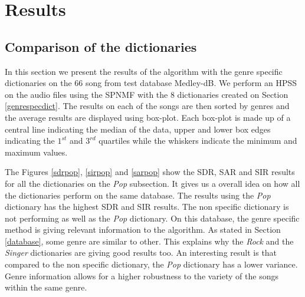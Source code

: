 \documentclass{article}
\begin{document}
\section{Results}


\subsection{Comparison of the dictionaries}

In this section we present the results of the algorithm with the genre specific dictionaries on the $66$ song from test database Medley-dB. We perform an HPSS on the audio files using the SPNMF with the $8$ dictionaries created on Section \ref{genrespecdict}. The results on each of the songs are then sorted by genres and the average results are displayed using box-plot. Each box-plot is made up of a central line indicating the median of the data, upper and lower box edges indicating the $1^{st}$ and $3^{rd}$ quartiles while the whiskers indicate the minimum and maximum values. 

The Figures \ref{sdrpop}, \ref{sirpop} and \ref{sarpop} show the SDR, SAR and SIR results for all the dictionaries on the \emph{Pop} subsection. It gives us a overall idea on how all the dictionaries perform on the same database. The results using the \emph{Pop} dictionary has the highest SDR and SIR results. The non specific dictionary is not performing as well as the \emph{Pop} dictionary. On this database, the genre specific method is giving relevant information to the algorithm. As stated in Section \ref{database}, some genre are similar to other. This explains why the \emph{Rock} and the \emph{Singer} dictionaries are giving good results too. 
An interesting result is that compared to the non specific dictionary, the \emph{Pop} dictionary has a lower variance. Genre information allows for a higher robustness to the variety of the songs within the same genre.  
\end{document}
